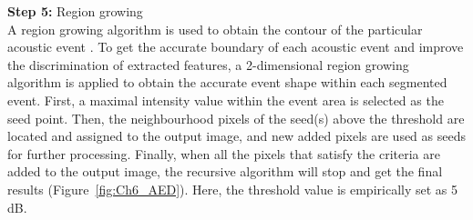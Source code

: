 \noindent \textbf{Step 5:} Region growing
\\
A region growing algorithm is used to obtain the contour of the particular acoustic event \citep{mallawaarachchi2008spectrogram}. To get the accurate boundary of each acoustic event and improve the discrimination of extracted features, a 2-dimensional region growing algorithm is applied to obtain the accurate event shape within each segmented event. First, a maximal intensity value within the event area is selected as the seed point. Then, the neighbourhood pixels of the seed(s) above the threshold are located and assigned to the output image, and new added pixels are used as seeds for further processing. Finally, when all the pixels that satisfy the criteria are added to the output image, the recursive algorithm will stop and get the final results (Figure~\ref{fig:Ch6_AED}). Here, the threshold value is empirically set as 5 dB.

